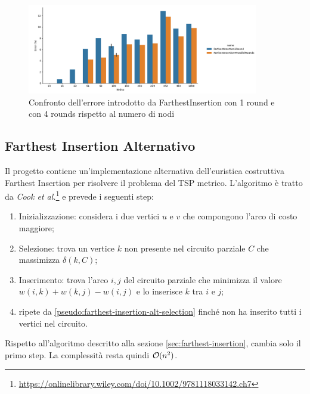 \begin{figure}[!ht]
    \centering

    \includegraphics[width=0.9\textwidth]{./images/FarthestInsertion1Round_vs_FarthestInsertion4ParallelRounds__approximation_error_.png}

    \caption{Confronto dell'errore introdotto da FarthestInsertion con 1 round e con 4 rounds rispetto al numero di nodi}
    \label{fig:farthest-insertion-1-4-rounds-accuracy-error}
\end{figure}

\subsection{Farthest Insertion Alternativo}
\label{alg:farthest-insertion-alt}

Il progetto  contiene
un'implementazione alternativa dell'euristica costruttiva Farthest
Insertion per risolvere il problema del TSP metrico. L'algoritmo è
tratto da \textit{Cook et al.}\footnote{\url{https://onlinelibrary.wiley.com/doi/10.1002/9781118033142.ch7}}
e prevede i seguenti step:

\begin{enumerate}
    \item Inizializzazione: considera i due vertici $u$ e $v$ che
      compongono l'arco di costo maggiore;
    \item Selezione: trova un vertice $k$ non presente nel circuito
      parziale $C$ che massimizza $\delta(k,C)$;
    \label{pseudo:farthest-insertion-alt-selection}
    \item Inserimento: trova l’arco ${i, j}$ del circuito parziale che
      minimizza il valore $w(i, k) + w(k, j) - w(i, j)$ e lo inserisce
      $k$ tra $i$ e $j$;
    \item ripete da \ref{pseudo:farthest-insertion-alt-selection}
      finché non ha inserito tutti i vertici nel circuito.
\end{enumerate}

\noindent Rispetto all'algoritmo descritto alla sezione
\ref{sec:farthest-insertion}, cambia solo il primo step. La
complessità resta quindi $\mathcal{O}(n^2)$.

